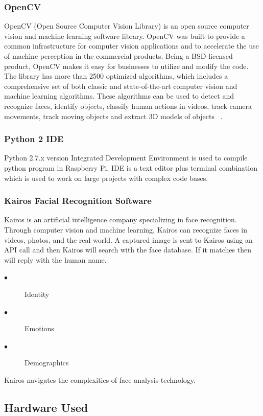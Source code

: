 \documentclass[sigconf]{acmart}
\begin{document}
\subsubsection{OpenCV}
OpenCV (Open Source Computer Vision Library) is an open source computer vision and machine learning software library. OpenCV was built to provide a common infrastructure for computer vision applications and to accelerate the use of machine perception in the commercial products. Being a BSD-licensed product, OpenCV makes it easy for businesses to utilize and modify the code. The library has more than 2500 optimized algorithms, which includes a comprehensive set of both classic and state-of-the-art computer vision and machine learning algorithms. These algorithms can be used to detect and recognize faces, identify objects, classify human actions in videos, track camera movements, track moving objects and extract 3D models of objects ~\cite{opencv}.

\subsubsection{Python 2 IDE}
Python 2.7.x version Integrated Development Environment is used to compile python program in Raspberry Pi. IDE is a text editor plus terminal combination which is used to work on large projects with complex code bases.

\subsubsection{Kairos Facial Recognition Software}
Kairos is an artificial intelligence company specializing in face recognition. Through computer vision and machine learning, Kairos can recognize faces in videos, photos, and the real-world. A captured image is sent to Kairos using an API call and then Kairos will search with the face database. If it matches then will reply with the human name.
\begin{description}
  \item[$\bullet$] Identity 
  \item[$\bullet$] Emotions 
  \item[$\bullet$] Demographics
\end{description}

Kairos navigates the complexities of face analysis technology.

\subsection{Hardware Used}
\end{document}
